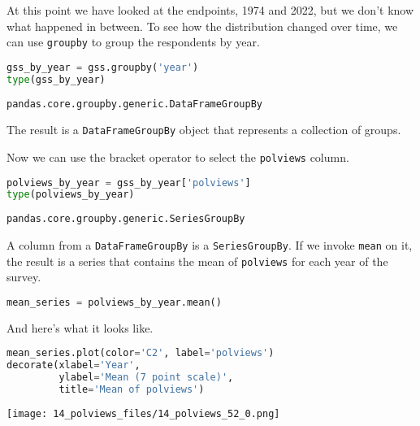 At this point we have looked at the endpoints, 1974 and 2022, but we
don't know what happened in between. To see how the distribution changed
over time, we can use \passthrough{\lstinline!groupby!} to group the
respondents by year.

\begin{lstlisting}[language=Python,style=source]
gss_by_year = gss.groupby('year')
type(gss_by_year)
\end{lstlisting}

\begin{lstlisting}[style=output]
pandas.core.groupby.generic.DataFrameGroupBy
\end{lstlisting}

The result is a \passthrough{\lstinline!DataFrameGroupBy!} object that
represents a collection of groups.

Now we can use the bracket operator to select the
\passthrough{\lstinline!polviews!} column.

\begin{lstlisting}[language=Python,style=source]
polviews_by_year = gss_by_year['polviews']
type(polviews_by_year)
\end{lstlisting}

\begin{lstlisting}[style=output]
pandas.core.groupby.generic.SeriesGroupBy
\end{lstlisting}

A column from a \passthrough{\lstinline!DataFrameGroupBy!} is a
\passthrough{\lstinline!SeriesGroupBy!}. If we invoke
\passthrough{\lstinline!mean!} on it, the result is a series that
contains the mean of \passthrough{\lstinline!polviews!} for each year of
the survey.

\begin{lstlisting}[language=Python,style=source]
mean_series = polviews_by_year.mean()
\end{lstlisting}

And here's what it looks like.

\begin{lstlisting}[language=Python,style=source]
mean_series.plot(color='C2', label='polviews')
decorate(xlabel='Year',
         ylabel='Mean (7 point scale)',
         title='Mean of polviews')
\end{lstlisting}

\begin{center}
\texttt{[image: 14\_polviews\_files/14\_polviews\_52\_0.png]}
\end{center}

